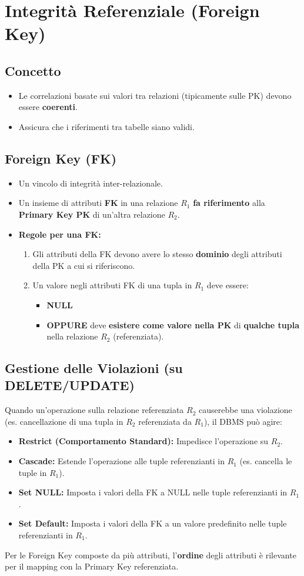 \documentclass{article}
\begin{document}
	\section{Integrità Referenziale (Foreign Key)}
	
	\subsection{Concetto}
	\begin{itemize}
		\item Le correlazioni basate sui valori tra relazioni (tipicamente sulle PK) devono essere \textbf{coerenti}.
		\item Assicura che i riferimenti tra tabelle siano validi.
	\end{itemize}
	
	\subsection{Foreign Key (FK)}
	\begin{itemize}
		\item Un vincolo di integrità inter-relazionale.
		\item Un insieme di attributi \textbf{FK} in una relazione $R_1$ \textbf{fa riferimento} alla \textbf{Primary Key PK} di un'altra relazione $R_2$.
		\item \textbf{Regole per una FK:}
		\begin{enumerate}
			\item Gli attributi della FK devono avere lo stesso \textbf{dominio} degli attributi della PK a cui si riferiscono.
			\item Un valore negli attributi FK di una tupla in $R_1$ deve essere:
			\begin{itemize}
				\item \textbf{NULL}
				\item \textbf{OPPURE} deve \textbf{esistere come valore nella PK} di \textbf{qualche tupla} nella relazione $R_2$ (referenziata).
			\end{itemize}
		\end{enumerate}
	\end{itemize}
	
	\subsection{Gestione delle Violazioni (su DELETE/UPDATE)}
	Quando un'operazione sulla relazione referenziata $R_2$ causerebbe una violazione (es. cancellazione di una tupla in $R_2$ referenziata da $R_1$), il DBMS può agire:
	\begin{itemize}
		\item \textbf{Restrict (Comportamento Standard):} Impedisce l'operazione su $R_2$.
		\item \textbf{Cascade:} Estende l'operazione alle tuple referenzianti in $R_1$ (es. cancella le tuple in $R_1$).
		\item \textbf{Set NULL:} Imposta i valori della FK a NULL nelle tuple referenzianti in $R_1$.
		\item \textbf{Set Default:} Imposta i valori della FK a un valore predefinito nelle tuple referenzianti in $R_1$.
	\end{itemize}
	
	Per le Foreign Key composte da più attributi, l'\textbf{ordine} degli attributi è rilevante per il mapping con la Primary Key referenziata.
	
	
\end{document}
